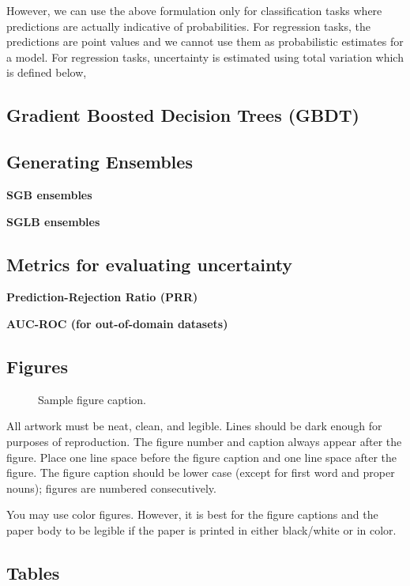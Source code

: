 \documentclass{article}
\begin{document}
However, we can use the above formulation only for classification tasks where predictions are actually indicative of probabilities. For regression tasks, the predictions are point values and we cannot use them as probabilistic estimates for a model. For regression tasks, uncertainty is estimated using total variation which is defined below,

\subsection{Gradient Boosted Decision Trees (GBDT)}

\subsection{Generating Ensembles}

\textbf{SGB ensembles}

\textbf{SGLB ensembles}

\subsection{Metrics for evaluating uncertainty}

\textbf{Prediction-Rejection Ratio (PRR)}

\textbf{AUC-ROC (for out-of-domain datasets)}

\newpage
\subsection{Figures}


\begin{figure}
  \centering
  \fbox{\rule[-.5cm]{0cm}{4cm} \rule[-.5cm]{4cm}{0cm}}
  \caption{Sample figure caption.}
\end{figure}


All artwork must be neat, clean, and legible. Lines should be dark enough for
purposes of reproduction. The figure number and caption always appear after the
figure. Place one line space before the figure caption and one line space after
the figure. The figure caption should be lower case (except for first word and
proper nouns); figures are numbered consecutively.


You may use color figures.  However, it is best for the figure captions and the
paper body to be legible if the paper is printed in either black/white or in
color.


\subsection{Tables}
\end{document}
